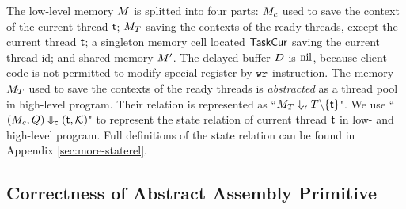 The low-level memory $M$ is splitted into four parts: 
$M_c$ used to save the context of the current thread $\textsf{t}$; 
$M_T$ saving the contexts of the ready threads, 
except the current thread $\textsf{t}$; a singleton memory 
cell located $\mathsf{TaskCur}$ saving the current thread id; and shared 
memory $M'$. 
The delayed buffer $D$ is $\text{nil}$, because client 
code is not permitted to modify special register by 
$\texttt{wr}{}$ instruction. 
The memory $M_T$ used to 
save the contexts of the ready threads is {\it abstracted} as a thread pool 
in high-level program. Their relation is represented as 
``${M_T} \Downarrow_{\textsf{r}} {T \backslash \{ \textsf{t} \}}$".  
We use ``${(M_c, Q)} \Downarrow_{\textsf{c}} {(\textsf{t}, \mathcal{K})}$" 
to represent the state relation of current thread $\textsf{t}$ 
in low- and high-level program. Full definitions of the state relation 
can be found in Appendix \ref{sec:more-staterel}. 

\subsection{Correctness of Abstract Assembly Primitive}
\label{subsec:correctness-primitive}

